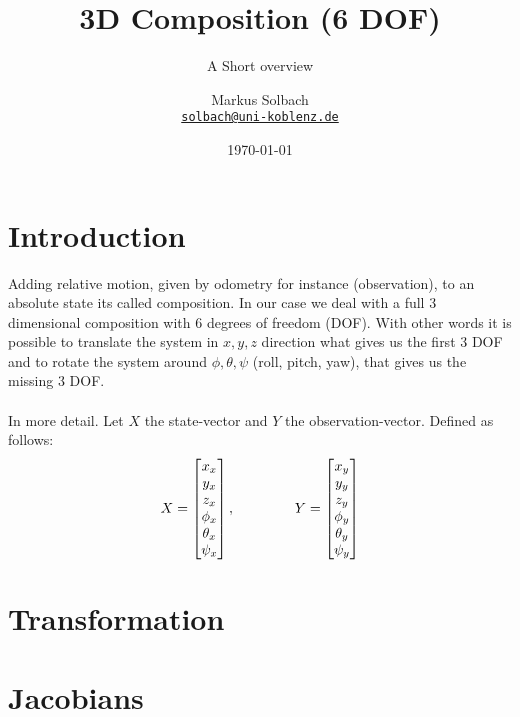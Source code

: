 \documentclass[10pt,a4paper]{scrartcl}
\author{Markus Solbach \\ \href{mailto:solbach@uni-koblenz.de}{\texttt{solbach@uni-koblenz.de}}}
\date{\today}
\begin{document}
\title{3D Composition (6 DOF)}
\subtitle{A Short overview}
\maketitle
\newpage

\section{Introduction}
Adding relative motion, given by odometry for instance (observation), to an absolute state its called composition. In our case we deal with a full 3 dimensional composition with 6 degrees of freedom (DOF). With other words it is possible to translate the system in $x, y, z$ direction what gives us the first 3 DOF and to rotate the system around $\phi, \theta, \psi$ (roll, pitch, yaw), that gives us the missing 3 DOF.
\\\\ In more detail. Let $X$ the state-vector and $Y$ the observation-vector. Defined as follows:
\begin{equation}
X = \begin{bmatrix} x_x \\ y_x \\ z_x \\ \phi_x \\ \theta_x \\ \psi_x \end{bmatrix}, \hspace{15 mm} Y = \begin{bmatrix} x_y \\ y_y \\ z_y \\ \phi_y \\ \theta_y \\ \psi_y \end{bmatrix}
\end{equation}


\section{Transformation}

\section{Jacobians}

\end{document}
